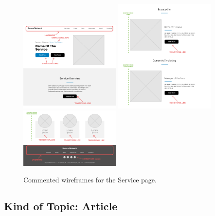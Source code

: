 \documentclass[12pt]{report}
\begin{document}
\begin{figure}[H]
	\centering
	\includegraphics[width=0.45\textwidth]{low_fid_wireframes/service/1.png}
	\includegraphics[width=0.45\textwidth]{low_fid_wireframes/service/2.png}
	\includegraphics[width=0.45\textwidth]{low_fid_wireframes/service/3.png}
	\caption{Commented wireframes for the Service page.}
\end{figure}
\clearpage
\subsection{Kind of Topic: Article}
\end{document}
